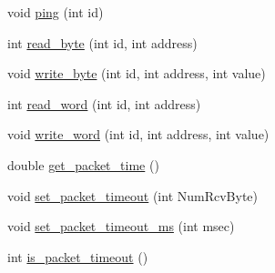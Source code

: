 \begin{DoxyCompactItemize}
\item 
void \hyperlink{classdynamixel_af2bd714423e7c4fc089762805c0c71f3}{ping} (int id)
\item 
int \hyperlink{classdynamixel_a888404b41c4c4395a0b745c77ff2cea9}{read\+\_\+byte} (int id, int address)
\item 
void \hyperlink{classdynamixel_a66c1e32cc45dd46d329f1fc212e46a3d}{write\+\_\+byte} (int id, int address, int value)
\item 
int \hyperlink{classdynamixel_a45e99341e82c5114f6e829c9141bf96f}{read\+\_\+word} (int id, int address)
\item 
void \hyperlink{classdynamixel_a925f62ce5e261e5ef4fe6dc46bdc7c63}{write\+\_\+word} (int id, int address, int value)
\item 
double \hyperlink{classdynamixel_a2fa5375537184c279a9ebfcfc0425071}{get\+\_\+packet\+\_\+time} ()
\item 
void \hyperlink{classdynamixel_a067f82c21ed176e18fa224d16f3d1c5b}{set\+\_\+packet\+\_\+timeout} (int Num\+Rcv\+Byte)
\item 
void \hyperlink{classdynamixel_a125b42f776c4aac520f274074f68b591}{set\+\_\+packet\+\_\+timeout\+\_\+ms} (int msec)
\item 
int \hyperlink{classdynamixel_afddd976dbc486cd08b92e0e6e4117519}{is\+\_\+packet\+\_\+timeout} ()
\end{DoxyCompactItemize}
